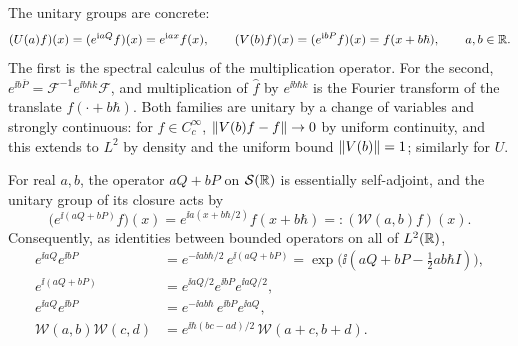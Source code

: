 The unitary groups are concrete:
\begin{equation}\label{eq:UV}
 (U(a)f)(x)=(e^{\mathrm{i} aQ}f)(x)=e^{\mathrm{i} ax}f(x),\qquad
 (V(b)f)(x)=(e^{\mathrm{i} bP}f)(x)=f(x+b\hbar),\qquad a,b\in\mathbb{R}.
\end{equation}
The first is the spectral calculus of the multiplication operator. For the
second, $e^{\ii b\overline P}=\mathcal F^{-1}e^{\ii b\hbar k}\mathcal F$, and
multiplication of $\hat f$ by $e^{\ii b\hbar k}$ is the Fourier transform
of the translate $f(\cdot+b\hbar)$. Both families are unitary by a change
of variables and strongly continuous: for $f\in C_c^\infty$,
$\left\lVert V(b)f-f\right\rVert\to0$ by uniform continuity, and this extends to $L^2$ by
density and the uniform bound $\left\lVert V(b)\right\rVert=1$; similarly for $U$.

\begin{theorem}\label{thm:weyl}
For real $a,b$, the operator $aQ+bP$ on $\mathcal{S}(\mathbb{R})$ is essentially
self-adjoint, and the unitary group of its closure acts by
\begin{equation}\label{eq:sumaction}
 \bigl(e^{\ii(aQ+bP)}f\bigr)(x)=e^{\ii a(x+b\hbar/2)}f(x+b\hbar)=:(\mathcal W(a,b)f)(x).
\end{equation}
Consequently, as identities between bounded operators on all of $L^2(\mathbb{R})$,
\begin{align}
 e^{\ii aQ}e^{\ii bP}&=e^{-\ii ab\hbar/2}\,e^{\ii(aQ+bP)}
 =\exp\bigl(\ii(aQ+bP-\tfrac12ab\hbar I)\bigr),\label{eq:weylbch}\\
 e^{\ii(aQ+bP)}&=e^{\ii aQ/2}e^{\ii bP}e^{\ii aQ/2},\label{eq:weylsym}\\
 e^{\ii aQ}e^{\ii bP}&=e^{-\ii ab\hbar}\,e^{\ii bP}e^{\ii aQ},\label{eq:weylcomm}\\
 \mathcal W(a,b)\mathcal W(c,d)&=e^{\ii\hbar(bc-ad)/2}\,\mathcal W(a+c,b+d).\label{eq:weylgroup}
\end{align}
\end{theorem}
